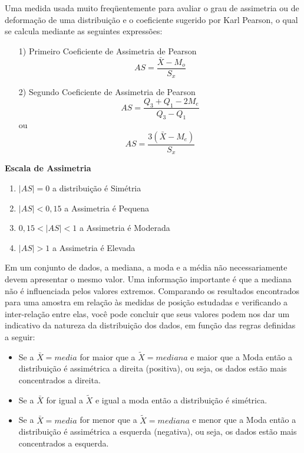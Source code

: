 
Uma medida usada muito freqüentemente para avaliar o grau de assimetria ou de deformação de uma distribuição e o coeficiente sugerido por Karl Pearson, o qual se calcula mediante as seguintes expressões:

\begin{enumerate}
  \item [{1)}]Primeiro Coeficiente de Assimetria de Pearson
  \begin{equation}\label{assimetria}
    AS=\frac{\bar{X}-M_{o}}{S_{x}}
\end{equation}
  \item [{2)}]Segundo Coeficiente de Assimetria de Pearson
  \begin{equation}\label{assimetria}
    AS= \frac{Q_{3}+Q_{1}-2M_{e}}{Q_{3}-Q_{1}}
\end{equation}
    ou
 \begin{equation}
    AS = \frac{3(\bar{X}-M_{e})}{S_{x}}
\end{equation}
\end{enumerate}






\textbf{Escala de Assimetria}

\begin{enumerate}
\item $|AS| =0$ a distribuição é Simétria
\item $|AS| < 0,15$ a Assimetria é Pequena
\item $0,15 < |AS| <1$ a Assimetria é Moderada
\item $|AS| > 1$ a Assimetria é Elevada
\end{enumerate}


\newpage 

Em um conjunto de dados, a mediana, a moda e a média
não necessariamente devem apresentar o mesmo valor. Uma
informação importante é que a mediana não é influenciada pelos valores extremos. Comparando os resultados encontrados para uma amostra em relação às medidas de posição estudadas e verificando a inter-relação entre elas, você pode concluir que seus valores podem nos dar um indicativo da natureza da distribuição dos dados, em função das regras definidas a seguir:


\begin{itemize}
\item Se a $\bar{X}=media$ for maior que a $\tilde{X}=mediana$ e maior que a Moda então a distribuição é assimétrica a direita (positiva), ou seja, os dados estão mais concentrados a direita.  	
\item Se a $\bar{X}$ for igual a $\tilde{X}$ e igual a moda então a distribuição é simétrica.
\item Se a $\bar{X}= media$ for menor que a $\tilde{X}= mediana$ e menor que a Moda então a distribuição é assimétrica a esquerda (negativa), ou seja, os dados estão mais concentrados a esquerda. 	
\end{itemize}

